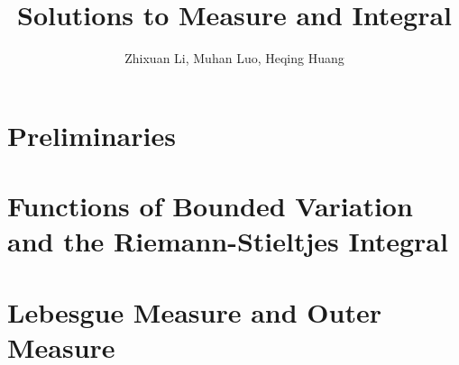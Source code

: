 \documentclass[11pt]{article}
\theoremstyle{definition}
\begin{document}
  \title{Solutions to Measure and Integral}
  \author{Zhixuan Li, Muhan Luo, Heqing Huang}
  \maketitle

  \section{Preliminaries}

  \section{Functions of Bounded Variation and the Riemann-Stieltjes Integral}
%  

  \section{Lebesgue Measure and Outer Measure}
  
\end{document}
